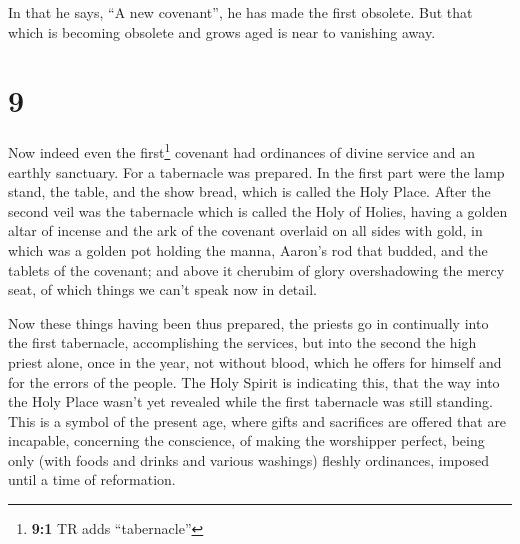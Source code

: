  In that he says, ``A new covenant'', he has made the
first obsolete. But that which is becoming obsolete and grows aged is
near to vanishing away.

\hypertarget{section-8}{%
\section{9}\label{section-8}}

 Now indeed even the first\footnote{\textbf{9:1} TR adds
  ``tabernacle''} covenant had ordinances of divine service and an
earthly sanctuary.  For a tabernacle was prepared. In the
first part were the lamp stand, the table, and the show bread, which is
called the Holy Place.  After the second veil was the
tabernacle which is called the Holy of Holies,  having a
golden altar of incense and the ark of the covenant overlaid on all
sides with gold, in which was a golden pot holding the manna, Aaron's
rod that budded, and the tablets of the covenant;  and
above it cherubim of glory overshadowing the mercy seat, of which things
we can't speak now in detail.

 Now these things having been thus prepared, the priests
go in continually into the first tabernacle, accomplishing the services,
 but into the second the high priest alone, once in the
year, not without blood, which he offers for himself and for the errors
of the people.  The Holy Spirit is indicating this, that
the way into the Holy Place wasn't yet revealed while the first
tabernacle was still standing.  This is a symbol of the
present age, where gifts and sacrifices are offered that are incapable,
concerning the conscience, of making the worshipper perfect,
 being only (with foods and drinks and various washings)
fleshly ordinances, imposed until a time of reformation.

